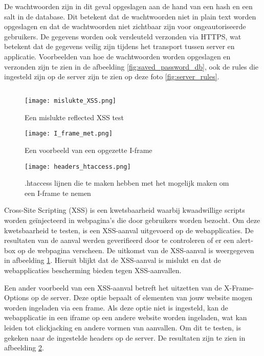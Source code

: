 De wachtwoorden zijn in dit geval opgeslagen aan de hand van een hash en een salt in de database. Dit betekent dat de 
wachtwoorden niet in plain text worden opgeslagen en dat de wachtwoorden niet zichtbaar zijn voor ongeautoriseerde gebruikers. 
De gegevens worden ook versleuteld verzonden via HTTPS, wat betekent dat de gegevens veilig zijn tijdens het transport tussen 
server en applicatie. Voorbeelden van hoe de wachtwoorden worden opgeslagen en verzonden zijn te zien in de afbeelding 
\ref{fig:saved_password_db}, ook de rules die ingesteld zijn op de server zijn te zien op deze foto \ref{fig:server_rules}.


\subsection{}
\begin{figure}
    \centering
    \texttt{[image: mislukte\_XSS.png]}
    \caption[Een mislukte reflected XSS test]{Een mislukte reflected XSS test}
    \label{fig:mislukte_XSS}
\end{figure}
\begin{figure}
    \centering
    \texttt{[image: I\_frame\_met.png]}
    \caption[Een voorbeeld van een opgezette I-frame]{Een voorbeeld van een opgezette I-frame}
    \label{fig:i_frame_met}
\end{figure}
\begin{figure}
    \centering
    \texttt{[image: headers\_htaccess.png]}
    \caption[.htaccess lijnen die te maken hebben met het mogelijk maken om een I-frame te nemen]{.htaccess lijnen die te maken hebben met het mogelijk maken om een I-frame te nemen}
    \label{fig:headers_htaccess}
\end{figure}

Cross-Site Scripting (XSS) is een kwetsbaarheid waarbij kwaadwillige scripts worden geïnjecteerd in webpagina's die door 
gebruikers worden bezocht. Om deze kwetsbaarheid te testen, is een XSS-aanval uitgevoerd op de webapplicaties. De resultaten 
van de aanval werden geverifieerd door te controleren of er een alert-box op de webpagina verscheen. De uitkomst van de 
XSS-aanval is weergegeven in afbeelding \ref{fig:mislukte_XSS}. Hieruit blijkt dat de XSS-aanval is mislukt en dat de webapplicaties
bescherming bieden tegen XSS-aanvallen.

Een ander voorbeeld van een XSS-aanval betreft het uitzetten van de X-Frame-Options op de server. Deze optie bepaalt of 
elementen van jouw website mogen worden ingeladen via een frame. Als deze optie niet is ingesteld, kan de webapplicatie in 
een iframe op een andere website worden ingeladen, wat kan leiden tot clickjacking en andere vormen van aanvallen. Om dit te 
testen, is gekeken naar de ingestelde headers op de server. De resultaten zijn te zien in afbeelding \ref{fig:i_frame_met}.

